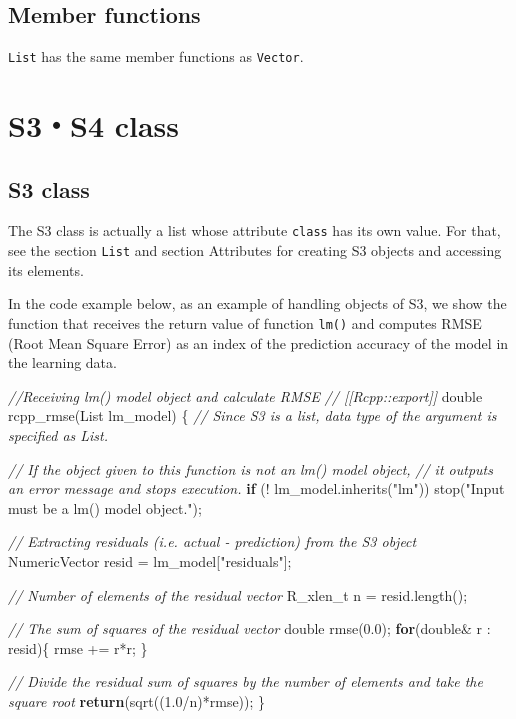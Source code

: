 \documentclass[]{book}
\newenvironment{Shaded}{\begin{snugshade}}{\end{snugshade}}
\newcommand{\CommentTok}[1]{\textcolor[rgb]{0.56,0.35,0.01}{\textit{#1}}}
\newcommand{\ControlFlowTok}[1]{\textcolor[rgb]{0.13,0.29,0.53}{\textbf{#1}}}
\newcommand{\DataTypeTok}[1]{\textcolor[rgb]{0.13,0.29,0.53}{#1}}
\newcommand{\FloatTok}[1]{\textcolor[rgb]{0.00,0.00,0.81}{#1}}
\newcommand{\NormalTok}[1]{#1}
\newcommand{\StringTok}[1]{\textcolor[rgb]{0.31,0.60,0.02}{#1}}
\begin{document}
\hypertarget{member-functions-3}{%
\section{Member functions}\label{member-functions-3}}

\texttt{List} has the same member functions as \texttt{Vector}.

\hypertarget{s3s4-class}{%
\chapter{S3・S4 class}\label{s3s4-class}}

\hypertarget{s3-class}{%
\section{S3 class}\label{s3-class}}

The S3 class is actually a list whose attribute \texttt{class} has its own value. For that, see the section \texttt{List} and section Attributes for creating S3 objects and accessing its elements.

In the code example below, as an example of handling objects of S3, we show the function that receives the return value of function \texttt{lm()} and computes RMSE (Root Mean Square Error) as an index of the prediction accuracy of the model in the learning data.

\begin{Shaded}
\begin{Highlighting}[]
\CommentTok{//Receiving lm() model object and calculate RMSE}
\CommentTok{// [[Rcpp::export]]}
\DataTypeTok{double}\NormalTok{ rcpp_rmse(List lm_model) \{}
    \CommentTok{// Since S3 is a list, data type of the argument is specified as List.}

    \CommentTok{// If the object given to this function is not an lm() model object,}
    \CommentTok{// it outputs an error message and stops execution.}
    \ControlFlowTok{if}\NormalTok{ (! lm_model.inherits(}\StringTok{"lm"}\NormalTok{)) stop(}\StringTok{"Input must be a lm() model object."}\NormalTok{);}

    \CommentTok{// Extracting residuals (i.e. actual - prediction) from the S3 object}
\NormalTok{    NumericVector resid  = lm_model[}\StringTok{"residuals"}\NormalTok{];}

    \CommentTok{// Number of elements of the residual vector}
    \DataTypeTok{R_xlen_t}\NormalTok{ n = resid.length();}

    \CommentTok{// The sum of squares of the residual vector}
    \DataTypeTok{double}\NormalTok{ rmse(}\FloatTok{0.0}\NormalTok{);}
    \ControlFlowTok{for}\NormalTok{(}\DataTypeTok{double}\NormalTok{& r : resid)\{}
\NormalTok{        rmse += r*r;}
\NormalTok{    \}}

    \CommentTok{// Divide the residual sum of squares by the number of elements and take the square root}
    \ControlFlowTok{return}\NormalTok{(sqrt((}\FloatTok{1.0}\NormalTok{/n)*rmse));}
\NormalTok{\}}
\end{Highlighting}
\end{Shaded}
\end{document}
